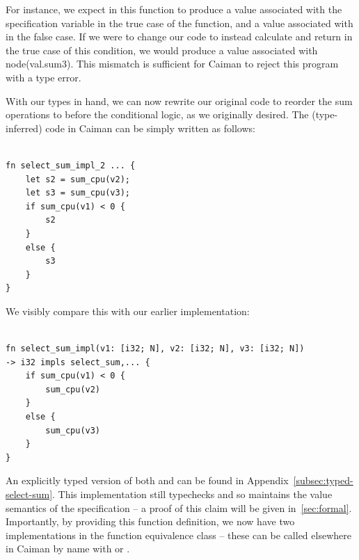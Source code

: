 For instance, we expect in this function to produce a value associated with the specification variable  in the true case of the  function, and a value associated with  in the false case.  If we were to change our code to instead calculate and return  in the true case of this condition, we would produce a value associated with node(val.sum3).  This mismatch is sufficient for Caiman to reject this program with a type error.

With our types in hand, we can now rewrite our original code to reorder the sum operations to before the conditional logic, as we originally desired.  The (type-inferred) code in Caiman can be simply written as follows:
%
\begin{lstlisting}

fn select_sum_impl_2 ... {
    let s2 = sum_cpu(v2);
    let s3 = sum_cpu(v3);
    if sum_cpu(v1) < 0 {
        s2
    }
    else {
        s3
    }
}
\end{lstlisting}
%
We visibly compare this with our earlier implementation:
%
\begin{lstlisting}
	
fn select_sum_impl(v1: [i32; N], v2: [i32; N], v3: [i32; N]) 
-> i32 impls select_sum,... {
	if sum_cpu(v1) < 0 { 
		sum_cpu(v2)
	}
	else {
		sum_cpu(v3)
	}
}
\end{lstlisting}
%
An explicitly typed version of both  and  can be found in Appendix~\ref{subsec:typed-select-sum}.  This implementation still typechecks and so maintains the value semantics of the  specification -- a proof of this claim will be given in~\ref{sec:formal}.  Importantly, by providing this function definition, we now have two implementations in the  function equivalence class -- these can be called elsewhere in Caiman by name with  or .

